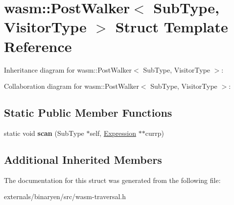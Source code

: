 \hypertarget{structwasm_1_1_post_walker}{}\section{wasm\+:\+:Post\+Walker$<$ Sub\+Type, Visitor\+Type $>$ Struct Template Reference}
\label{structwasm_1_1_post_walker}


Inheritance diagram for wasm\+:\+:Post\+Walker$<$ Sub\+Type, Visitor\+Type $>$\+:


Collaboration diagram for wasm\+:\+:Post\+Walker$<$ Sub\+Type, Visitor\+Type $>$\+:
\subsection*{Static Public Member Functions}
\begin{DoxyCompactItemize}
\item 
\mbox{\label{structwasm_1_1_post_walker_a3c813c8ae85d13a671e0bd393a05ea07}} 
static void {\bfseries scan} (Sub\+Type $\ast$self, \mbox{\hyperlink{classwasm_1_1_expression}{Expression}} $\ast$$\ast$currp)
\end{DoxyCompactItemize}
\subsection*{Additional Inherited Members}


The documentation for this struct was generated from the following file\+:\begin{DoxyCompactItemize}
\item 
externals/binaryen/src/wasm-\/traversal.\+h\end{DoxyCompactItemize}
